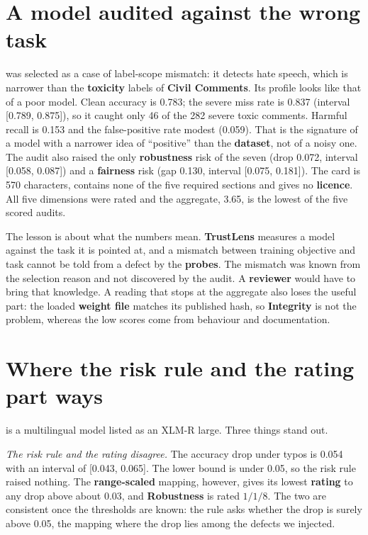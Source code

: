 \section{A model audited against the wrong task}
 was selected as a case of label-scope mismatch: it detects hate speech, which is narrower than the \textbf{toxicity} labels of \textbf{Civil Comments}. Its profile looks like that of a poor model. Clean accuracy is 0.783; the severe miss rate is 0.837 (interval [0.789, 0.875]), so it caught only 46 of the 282 severe toxic comments. Harmful recall is 0.153 and the false-positive rate modest (0.059). That is the signature of a model with a narrower idea of ``positive'' than the \textbf{dataset}, not of a noisy one. The audit also raised the only \textbf{robustness} risk of the seven (drop 0.072, interval [0.058, 0.087]) and a \textbf{fairness} risk (gap 0.130, interval [0.075, 0.181]). The card is 570 characters, contains none of the five required sections and gives no \textbf{licence}. All five dimensions were rated and the aggregate, 3.65, is the lowest of the five scored audits.

The lesson is about what the numbers mean. \textbf{TrustLens} measures a model against the task it is pointed at, and a mismatch between training objective and task cannot be told from a defect by the \textbf{probes}. The mismatch was known from the selection reason and not discovered by the audit. A \textbf{reviewer} would have to bring that knowledge. A reading that stops at the aggregate also loses the useful part: the loaded \textbf{weight file} matches its published hash, so \textbf{Integrity} is not the problem, whereas the low scores come from behaviour and documentation.

\section{Where the risk rule and the rating part ways}
 is a multilingual model listed as an XLM-R large. Three things stand out.

\emph{The risk rule and the rating disagree.} The accuracy drop under typos is 0.054 with an interval of [0.043, 0.065]. The lower bound is under 0.05, so the risk rule raised nothing. The \textbf{range-scaled} mapping, however, gives its lowest \textbf{rating} to any drop above about 0.03, and \textbf{Robustness} is rated $1/1/8$. The two are consistent once the thresholds are known: the rule asks whether the drop is surely above 0.05, the mapping where the drop lies among the defects we injected.

